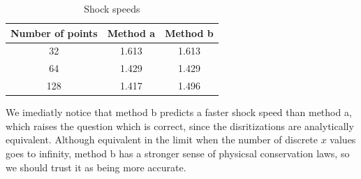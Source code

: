 \documentclass[12pt, letterpaper]{article}
\begin{document}
\begin{table} [!b]
  \centering
  \caption{Shock speeds}
  \begin{tabular}{c c c}
    \hline\hline
    Number of points & Method a & Method b \\
    \hline
    32  & 1.613 & 1.613 \\
    64  & 1.429 & 1.429 \\
    128 & 1.417 & 1.496 \\
    \hline\hline
  \end{tabular}
  \label{tab:speed}
\end{table}

We imediatly notice that method b predicts a faster shock speed than method a,
which raises the question which is correct, since the disritizations are
analytically equivalent. Although equivalent in the limit when the number of
discrete \(x\) values goes to infinity, method b has a stronger sense of
physicsal conservation laws, so we should trust it as being more accurate.
\end{document}
